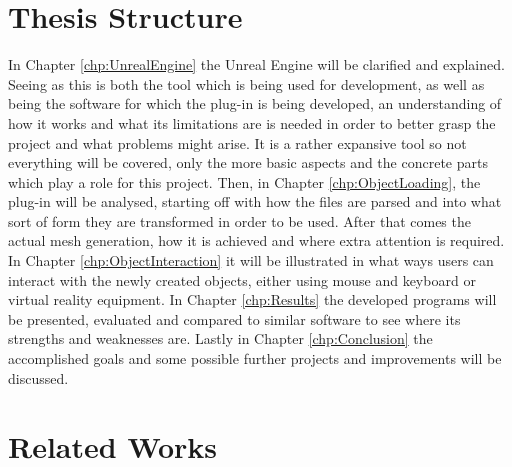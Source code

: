 \section{Thesis Structure}
In Chapter \ref{chp:UnrealEngine} the Unreal Engine will be clarified and explained. Seeing as this is both the tool which is being used for development, as well as being the software for which the plug-in is being developed, an understanding of how it works and what its limitations are is needed in order to better grasp the project and what problems might arise. It is a rather expansive tool so not everything will be covered, only the more basic aspects and the concrete parts which play a role for this project. Then, in Chapter \ref{chp:ObjectLoading}, the plug-in will be analysed, starting off with how the files are parsed and into what sort of form they are transformed in order to be used. After that comes the actual mesh generation, how it is achieved and where extra attention is required. In Chapter \ref{chp:ObjectInteraction} it will be illustrated in what ways users can interact with the newly created objects, either using mouse and keyboard or virtual reality equipment. In Chapter \ref{chp:Results} the developed programs will be presented, evaluated and compared to similar software to see where its strengths and weaknesses are. Lastly in Chapter \ref{chp:Conclusion} the accomplished goals and some possible further projects and improvements will be discussed.

\section{Related Works}


